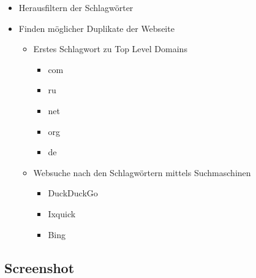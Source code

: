 \begin{itemize}
  \item Herausfiltern der Schlagwörter
  \item Finden möglicher Duplikate der Webseite
  \begin{itemize}
    \item Erstes Schlagwort zu Top Level Domains
    \begin{itemize}
      \item com
      \item ru
      \item net
      \item org
      \item de
    \end{itemize}
    \item Websuche nach den Schlagwörtern mittels Suchmaschinen
    \begin{itemize}
      \item DuckDuckGo
      \item Ixquick
      \item Bing
    \end{itemize}
  \end{itemize}
\end{itemize}

\subsection{Screenshot}

